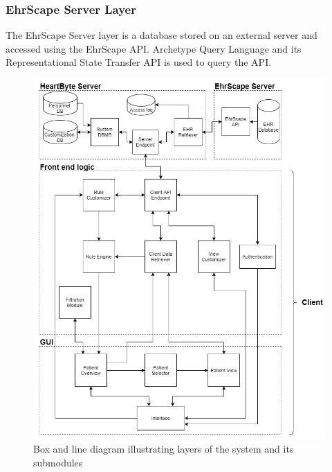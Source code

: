\documentclass{scrreprt}
\begin{document}
\subsubsection{EhrScape Server Layer}
The EhrScape Server layer is a database stored on an external server and accessed using the EhrScape API. Archetype Query Language and its Representational State Transfer API is used to query the API.

\begin{figure}[htp]
    \centering
    \includegraphics[width=15cm]{architecture.png}
    \caption{Box and line diagram illustrating layers of the system and its submodules}
    \label{fig: boxAndLineDiag}
\end{figure}
\end{document}
